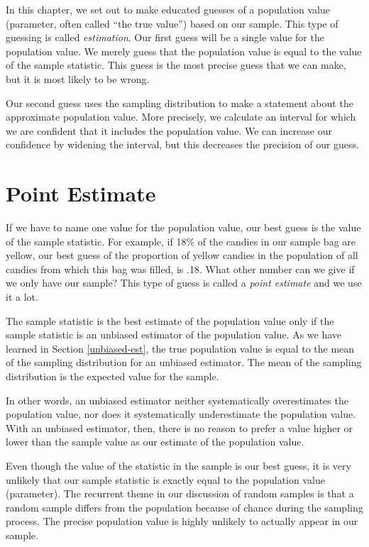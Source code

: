 \documentclass[a4paper]{book}
\theoremstyle{definition}
\theoremstyle{definition}
\theoremstyle{definition}
\theoremstyle{remark}
\begin{document}
In this chapter, we set out to make educated guesses of a population
value (parameter, often called ``the true value'') based on our sample.
This type of guessing is called \emph{estimation}. Our first guess will
be a single value for the population value. We merely guess that the
population value is equal to the value of the sample statistic. This
guess is the most precise guess that we can make, but it is most likely
to be wrong.

Our second guess uses the sampling distribution to make a statement
about the approximate population value. More precisely, we calculate an
interval for which we are confident that it includes the population
value. We can increase our confidence by widening the interval, but this
decreases the precision of our guess.

\section{Point Estimate}\label{point-estimate}

If we have to name one value for the population value, our best guess is
the value of the sample statistic. For example, if 18\% of the candies
in our sample bag are yellow, our best guess of the proportion of yellow
candies in the population of all candies from which this bag was filled,
is .18. What other number can we give if we only have our sample? This
type of guess is called a \emph{point estimate} and we use it a lot.

The sample statistic is the best estimate of the population value only
if the sample statistic is an unbiased estimator of the population
value. As we have learned in Section \ref{unbiased-est}, the true
population value is equal to the mean of the sampling distribution for
an unbiased estimator. The mean of the sampling distribution is the
expected value for the sample.

In other words, an unbiased estimator neither systematically
overestimates the population value, nor does it systematically
underestimate the population value. With an unbiased estimator, then,
there is no reason to prefer a value higher or lower than the sample
value as our estimate of the population value.

Even though the value of the statistic in the sample is our best guess,
it is very unlikely that our sample statistic is exactly equal to the
population value (parameter). The recurrent theme in our discussion of
random samples is that a random sample differs from the population
because of chance during the sampling process. The precise population
value is highly unlikely to actually appear in our sample.
\end{document}
